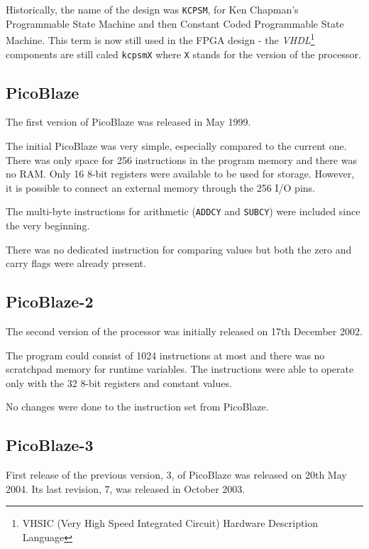     Historically, the name of the design was \texttt{KCPSM}, for Ken Chapman's Programmable State Machine and then Constant Coded Programmable State Machine. This term is now still used in the FPGA design - the \emph{VHDL}\footnote{VHSIC (Very High Speed Integrated Circuit) Hardware Description Language} components are still caled \texttt{kcpsmX} where \texttt{X} stands for the version of the processor.\cite{DSPwFPGA}

        \subsection{PicoBlaze}

        The first version of PicoBlaze was released in May 1999.

        The initial PicoBlaze was very simple, especially compared to the current one. There was only space for 256 instructions in the program memory and there was no RAM. Only 16 8-bit registers were available to be used for storage. However, it is possible to connect an external memory through the 256 I/O pins.

        The multi-byte instructions for arithmetic (\texttt{ADDCY} and \texttt{SUBCY}) were included since the very beginning.

        There was no dedicated instruction for comparing values but both the zero and carry flags were already present.\cite{PicoBlaze}

        \subsection{PicoBlaze-2}

        The second version of the processor was initially released on 17th December 2002.

        The program could consist of 1024 instructions at most and there was no scratchpad memory for runtime variables. The instructions were able to operate only with the 32 8-bit registers and constant values.

        No changes were done to the instruction set from PicoBlaze.\cite{PicoBlaze2}

        \subsection{PicoBlaze-3}

        First release of the previous version, 3, of PicoBlaze was released on 20th May 2004. Its last revision, 7, was released in October 2003.

